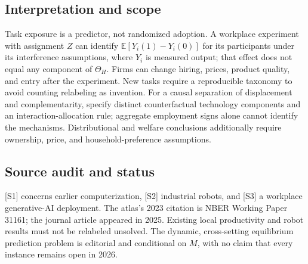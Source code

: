 \documentclass[11pt,a4paper]{article}
\begin{document}
\subsection*{Interpretation and scope}
Task exposure is a predictor, not randomized adoption. A workplace experiment with assignment $Z$ can identify $\mathbb E[Y_i(1)-Y_i(0)]$ for its participants under its interference assumptions, where $Y_i$ is measured output; that effect does not equal any component of $\Theta_H$. Firms can change hiring, prices, product quality, and entry after the experiment. New tasks require a reproducible taxonomy to avoid counting relabeling as invention. For a causal separation of displacement and complementarity, specify distinct counterfactual technology components and an interaction-allocation rule; aggregate employment signs alone cannot identify the mechanisms. Distributional and welfare conclusions additionally require ownership, price, and household-preference assumptions.
\subsection*{Source audit and status}
[S1] concerns earlier computerization, [S2] industrial robots, and [S3] a workplace generative-AI deployment. The atlas's 2023 citation is NBER Working Paper 31161; the journal article appeared in 2025. Existing local productivity and robot results must not be relabeled unsolved. The dynamic, cross-setting equilibrium prediction problem is editorial and conditional on $M$, with no claim that every instance remains open in 2026.
\end{document}
